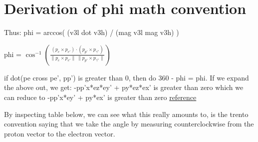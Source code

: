 \chapter{Derivation of phi math convention}


Thus:
phi = arccos( (v3l dot v3h) / (mag v3l mag v3h) ) 

phi =    \footnotesize{$\cos^{-1} \left( \frac{ \left(p_{e} \times p_{e'} \right) \cdot \left( p_{p'} \times p_{\gamma^*} \right) }{ \lVert p_{e} \times p_{e'} \rVert \: \lVert p_{p'} \times p_{\gamma^*} \rVert} \right)$}

if dot(pe cross pe', pp') is greater than 0, then do 360 - phi = phi.
If we expand the above out, we get:
-pp'x*ez*ey' + py*ez*ex' is greater than zero
which we can reduce to 
-pp'x*ey' + py*ex' is greater than zero \href{https://www.overleaf.com/project/6140d04f4cd346c4b187c1d8#}{reference}

By inspecting table below, we can see what this really amounts to, is the trento convention saying that we take the angle by measuring counterclockwise from the proton vector to the electron vector.


